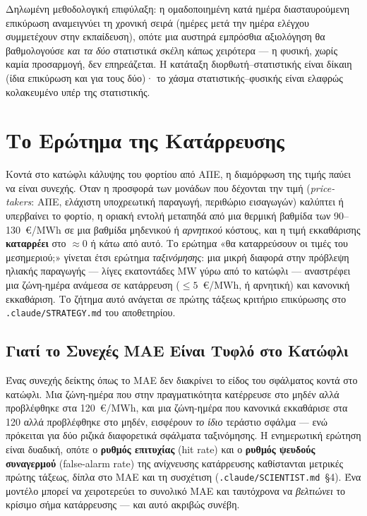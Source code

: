 Δηλωμένη μεθοδολογική επιφύλαξη: η ομαδοποιημένη κατά ημέρα διασταυρούμενη επικύρωση αναμειγνύει τη χρονική σειρά (ημέρες μετά την ημέρα ελέγχου συμμετέχουν στην εκπαίδευση), οπότε μια αυστηρά εμπρόσθια αξιολόγηση θα βαθμολογούσε \emph{και τα δύο} στατιστικά σκέλη κάπως χειρότερα --- η φυσική, χωρίς καμία προσαρμογή, δεν επηρεάζεται. Η κατάταξη διορθωτή--στατιστικής είναι δίκαιη (ίδια επικύρωση και για τους δύο)· το χάσμα στατιστικής--φυσικής είναι ελαφρώς κολακευμένο υπέρ της στατιστικής.


\section{Το Ερώτημα της Κατάρρευσης}
\label{sec:collapse-question}

Κοντά στο κατώφλι κάλυψης του φορτίου από ΑΠΕ, η διαμόρφωση της τιμής παύει να είναι συνεχής. Όταν η προσφορά των μονάδων που δέχονται την τιμή (\emph{price-takers}: ΑΠΕ, ελάχιστη υποχρεωτική παραγωγή, περιθώριο εισαγωγών) καλύπτει ή υπερβαίνει το φορτίο, η οριακή εντολή μεταπηδά από μια θερμική βαθμίδα των 90--130~€/MWh σε μια βαθμίδα μηδενικού ή \emph{αρνητικού} κόστους, και η τιμή εκκαθάρισης \textbf{καταρρέει} στο $\approx 0$ ή κάτω από αυτό. Το ερώτημα «θα καταρρεύσουν οι τιμές του μεσημεριού;» γίνεται έτσι ερώτημα \emph{ταξινόμησης}: μια μικρή διαφορά στην πρόβλεψη ηλιακής παραγωγής --- λίγες εκατοντάδες MW γύρω από το κατώφλι --- αναστρέφει μια ζώνη-ημέρα ανάμεσα σε κατάρρευση ($\le 5$~€/MWh, ή αρνητική) και κανονική εκκαθάριση. Το ζήτημα αυτό ανάγεται σε πρώτης τάξεως κριτήριο επικύρωσης στο \texttt{.claude/STRATEGY.md} του αποθετηρίου.

\subsection{Γιατί το Συνεχές MAE Είναι Τυφλό στο Κατώφλι}
\label{subsec:mae-blind}

Ένας συνεχής δείκτης όπως το MAE δεν διακρίνει το είδος του σφάλματος κοντά στο κατώφλι. Μια ζώνη-ημέρα που στην πραγματικότητα κατέρρευσε στο μηδέν αλλά προβλέφθηκε στα 120~€/MWh, και μια ζώνη-ημέρα που κανονικά εκκαθάρισε στα 120 αλλά προβλέφθηκε στο μηδέν, εισφέρουν \emph{το ίδιο} τεράστιο σφάλμα --- ενώ πρόκειται για δύο ριζικά διαφορετικά σφάλματα ταξινόμησης. Η ενημερωτική ερώτηση είναι δυαδική, οπότε ο \textbf{ρυθμός επιτυχίας} (hit rate) και ο \textbf{ρυθμός ψευδούς συναγερμού} (false-alarm rate) της ανίχνευσης κατάρρευσης καθίστανται μετρικές πρώτης τάξεως, δίπλα στο MAE και τη συσχέτιση (\texttt{.claude/SCIENTIST.md}~§4). Ένα μοντέλο μπορεί να χειροτερεύει το συνολικό MAE και ταυτόχρονα να \emph{βελτιώνει} το κρίσιμο σήμα κατάρρευσης --- και αυτό ακριβώς συνέβη.

